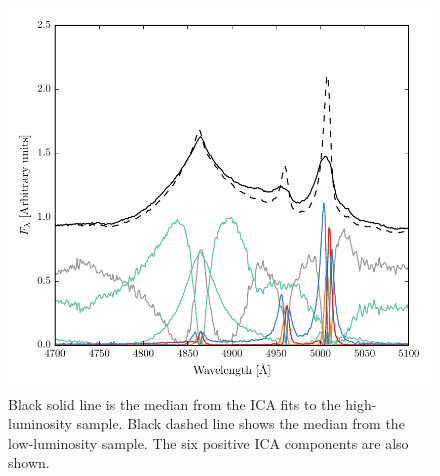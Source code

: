 \begin{figure}
    \centering
    \includegraphics[width=\columnwidth]{figures/chapter04/mfica_components.pdf} 
    \caption{Black solid line is the median from the ICA fits to the high-luminosity sample. Black dashed line shows the median from the low-luminosity sample. The six positive ICA components are also shown.}     
    \label{fig:mfica_components}
\end{figure}

